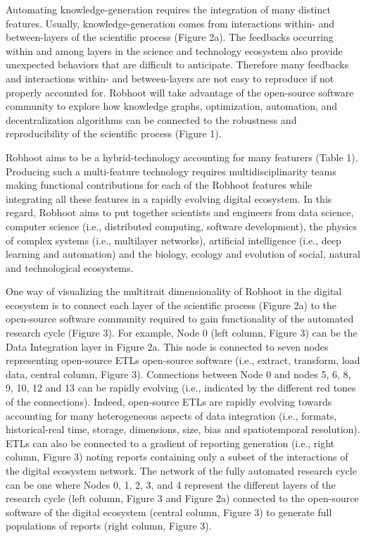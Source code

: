 \documentclass[10pt, a4paper, twocolumn]{article} %
\begin{document}
{  Automating knowledge-generation requires the integration of many
  distinct features. Usually, knowledge-generation comes from
  interactions within- and between-layers of the scientific process
  (Figure 2a). The feedbacks occurring within and among layers in the
  science and technology ecosystem also provide unexpected behaviors
  that are difficult to anticipate. Therefore many feedbacks and
  interactions within- and between-layers are not easy to reproduce if
  not properly accounted for. Robhoot will take advantage of the
  open-source software community to explore how knowledge graphs,
  optimization, automation, and decentralization algorithms can be
  connected to the robustness and reproducibility of the scientific
  process (Figure 1).

  Robhoot aims to be a hybrid-technology accounting for many featurers
  (Table 1). Producing such a multi-feature technology requires
  multidisciplinarity teams making functional contributions for each
  of the Robhoot features while integrating all these features in a
  rapidly evolving digital ecosystem. In this regard, Robhoot aims to
  put together scientists and engineers from data science, computer
  science (i.e., distributed computing, software development), the
  physics of complex systems (i.e., multilayer networks), artificial
  intelligence (i.e., deep learning and automation) and the biology,
  ecology and evolution of social, natural and technological
  ecosystems.

  One way of visualizing the multitrait dimensionality of Robhoot in
  the digital ecosystem is to connect each layer of the scientific
  process (Figure 2a) to the open-source software community required
  to gain functionality of the automated research cycle (Figure
  3). For example, Node 0 (left column, Figure 3) can be the Data
  Integration layer in Figure 2a. This node is connected to seven
  nodes representing open-source ETLs open-source software (i.e.,
  extract, transform, load data, central column, Figure
  3). Connections between Node 0 and nodes 5, 6, 8, 9, 10, 12 and 13
  can be rapidly evolving (i.e., indicated by the different red
  tones of the connections). Indeed, open-source ETLs are rapidly
  evolving towards accounting for many heterogeneous aspects of data
  integration (i.e., formats, historical-real time, storage,
  dimensions, size, bias and spatiotemporal resolution). ETLs can
  also be connected to a gradient of reporting generation (i.e., right
  column, Figure 3) noting reports containing only a subset of the
  interactions of the digital ecosystem network. The network of the
  fully automated research cycle can be one where Nodes 0, 1, 2, 3,
  and 4 represent the different layers of the research cycle (left
  column, Figure 3 and Figure 2a) connected to the open-source
  software of the digital ecosystem (central column, Figure 3) to
  generate full populations of reports (right column, Figure 3).

}
\end{document}
